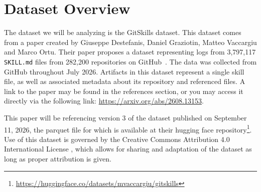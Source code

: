 \section{Dataset Overview}

The dataset we will be analyzing is the GitSkills dataset.
This dataset comes from a paper created by Giuseppe Destefanis, Daniel Graziotin, Matteo Vaccargiu and Marco Ortu.
Their paper proposes a dataset representing logs from 3,797,117 \texttt{SKILL.md} files from 282,200 repositories on GitHub~\cite{gitskills2027}.
The data was collected from GitHub throughout July 2026.
Artifacts in this dataset represent a single skill file, as well as associated metadata about its repository and referenced files.
A link to the paper may be found in the references section, or you may access it directly via the following link: \url{https://arxiv.org/abs/2608.13153}.

This paper will be referencing version 3 of the dataset published on September 11, 2026, 
the parquet file for which is available at their hugging face repository\footnote{\url{https://huggingface.co/datasets/mvaccargiu/gitskills}}.
Use of this dataset is governed by the Creative Commons Attribution 4.0 International License 
, which allows for sharing and adaptation of the dataset as long as proper attribution is given.